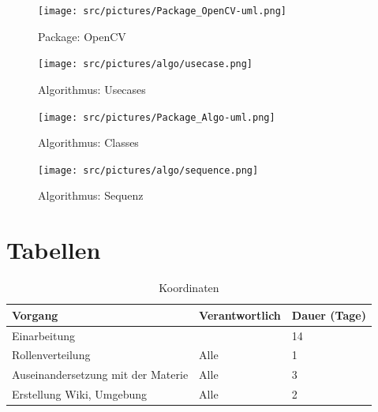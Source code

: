 \begin{appendix}
        \begin{figure}[ht]
            \centering
            \texttt{[image: src/pictures/Package\_OpenCV-uml.png]}
            \caption{Package: OpenCV}
            \label{img:package:ocv}
        \end{figure}

        \cleardoubleemptypage

        \begin{figure}[ht]
            \centering
            \texttt{[image: src/pictures/algo/usecase.png]}
            \caption{Algorithmus: Usecases}
            \label{img:algo:usecases}
        \end{figure}

        \cleardoubleemptypage

        \begin{figure}[ht]
            \centering
            \texttt{[image: src/pictures/Package\_Algo-uml.png]}
            \caption{Algorithmus: Classes}
            \label{img:algo:classes}
        \end{figure}

        \cleardoubleemptypage

        \begin{figure}[ht]
            \centering
            \texttt{[image: src/pictures/algo/sequence.png]}
            \caption{Algorithmus: Sequenz}
            \label{img:algo:sequence}
        \end{figure}

    \chapter{Tabellen}

        \begin{table}[h]
            \caption{Koordinaten}
            \label{tbl:cmtbl}
            \begin{center}
                \begin{tabular}[]{| l | l | l |}
                    Vorgang & Verantwortlich & Dauer (Tage) \\
                    \hline

                    Einarbeitung                       &      & 14 \\
                    \hline
                    Rollenverteilung                   & Alle & 1 \\
                    Auseinandersetzung mit der Materie & Alle & 3 \\
                    Erstellung Wiki, Umgebung          & Alle & 2 \\


\end{tabular}
\end{center}
\end{table}
\end{appendix}
